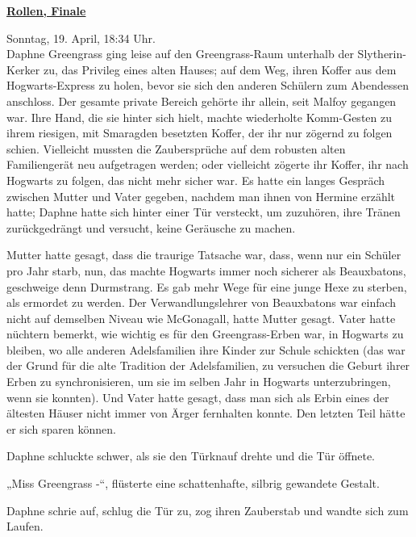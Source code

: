 

\hypertarget{rollen-finale}{%

\textbf{\uline{Rollen, Finale}}

Sonntag, 19. April, 18:34 Uhr.\\ Daphne Greengrass ging leise auf den Greengrass-Raum unterhalb der Slytherin-Kerker zu, das Privileg eines alten Hauses; auf dem Weg, ihren Koffer aus dem Hogwarts-Express zu holen, bevor sie sich den anderen Schülern zum Abendessen anschloss. Der gesamte private Bereich gehörte ihr allein, seit Malfoy gegangen war. Ihre Hand, die sie hinter sich hielt, machte wiederholte Komm-Gesten zu ihrem riesigen, mit Smaragden besetzten Koffer, der ihr nur zögernd zu folgen schien. Vielleicht mussten die Zaubersprüche auf dem robusten alten Familiengerät neu aufgetragen werden; oder vielleicht zögerte ihr Koffer, ihr nach Hogwarts zu folgen, das nicht mehr sicher war. Es hatte ein langes Gespräch zwischen Mutter und Vater gegeben, nachdem man ihnen von Hermine erzählt hatte; Daphne hatte sich hinter einer Tür versteckt, um zuzuhören, ihre Tränen zurückgedrängt und versucht, keine Geräusche zu machen.

Mutter hatte gesagt, dass die traurige Tatsache war, dass, wenn nur ein Schüler pro Jahr starb, nun, das machte Hogwarts immer noch sicherer als Beauxbatons, geschweige denn Durmstrang. Es gab mehr Wege für eine junge Hexe zu sterben, als ermordet zu werden. Der Verwandlungslehrer von Beauxbatons war einfach nicht auf demselben Niveau wie McGonagall, hatte Mutter gesagt. Vater hatte nüchtern bemerkt, wie wichtig es für den Greengrass-Erben war, in Hogwarts zu bleiben, wo alle anderen Adelsfamilien ihre Kinder zur Schule schickten (das war der Grund für die alte Tradition der Adelsfamilien, zu versuchen die Geburt ihrer Erben zu synchronisieren, um sie im selben Jahr in Hogwarts unterzubringen, wenn sie konnten). Und Vater hatte gesagt, dass man sich als Erbin eines der ältesten Häuser nicht immer von Ärger fernhalten konnte. Den letzten Teil hätte er sich sparen können.

Daphne schluckte schwer, als sie den Türknauf drehte und die Tür öffnete.

„Miss Greengrass -“, flüsterte eine schattenhafte, silbrig gewandete Gestalt.

Daphne schrie auf, schlug die Tür zu, zog ihren Zauberstab und wandte sich zum Laufen.

}
